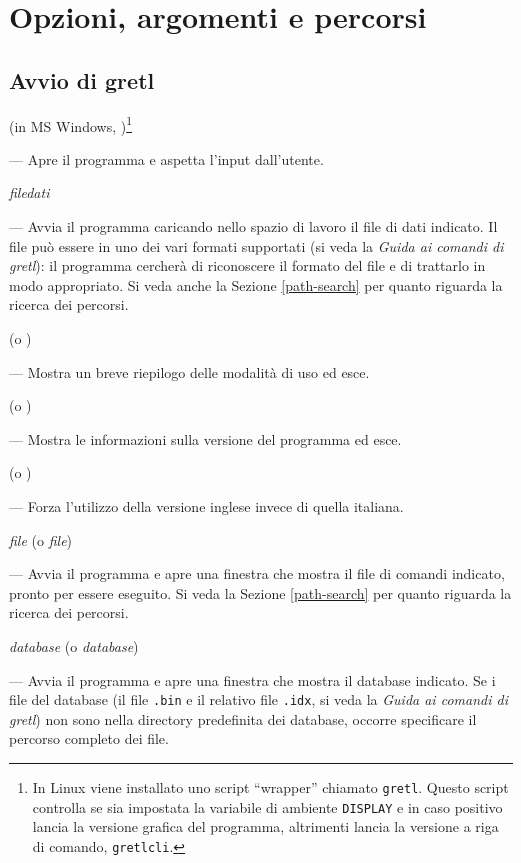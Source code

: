 \chapter{Opzioni, argomenti e percorsi}
\label{optarg}

\section{Avvio di gretl}
\label{optarg1}


 (in MS Windows, )\footnote{In Linux
  viene installato uno script ``wrapper'' chiamato \texttt{gretl}.
  Questo script controlla se sia impostata la variabile di ambiente
  \texttt{DISPLAY} e in caso positivo lancia la versione grafica del
  programma, altrimenti lancia la versione a riga di comando,
  \texttt{gretlcli}.}

--- Apre il programma e aspetta l'input dall'utente.
      
 \textsl{filedati}
      
--- Avvia il programma caricando nello spazio di lavoro il file di
dati indicato. Il file può essere in uno dei vari formati supportati
(si veda la \emph{Guida ai comandi di gretl}): il programma cercherà
di riconoscere il formato del file e di trattarlo in modo
appropriato. Si veda anche la Sezione \ref{path-search} per quanto
riguarda la ricerca dei percorsi.
      
 (o )
      
--- Mostra un breve riepilogo delle modalità di uso ed esce.
      
 (o )
      
--- Mostra le informazioni sulla versione del programma ed esce.
      
 (o )
      
--- Forza l'utilizzo della versione inglese invece di quella italiana.
      
 \textsl{file} (o  \textsl{file})
      
--- Avvia il programma e apre una finestra che mostra il file di
comandi indicato, pronto per essere eseguito. Si veda la Sezione
\ref{path-search} per quanto riguarda la ricerca dei percorsi.
      
 \textsl{database} (o 
\textsl{database})
      
--- Avvia il programma e apre una finestra che mostra il database
indicato. Se i file del database (il file \texttt{.bin} e il relativo
file \texttt{.idx}, si veda la \emph{Guida ai comandi di gretl}) non
sono nella directory predefinita dei database, occorre specificare il
percorso completo dei file.
      
